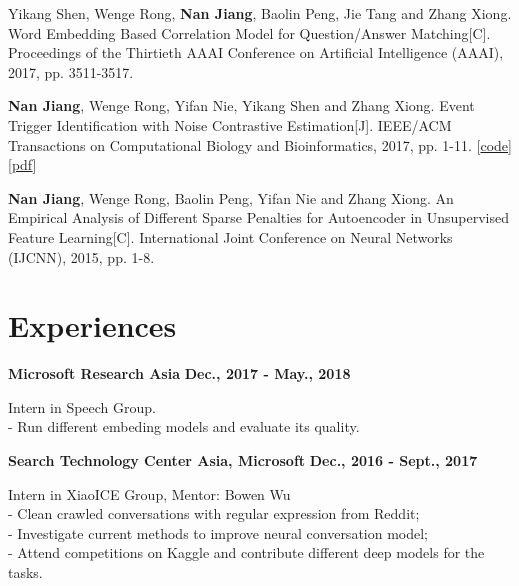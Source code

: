 \documentclass[margin,line]{resume}
\begin{document}
\begin{resume}
Yikang Shen, Wenge Rong, \textbf{Nan Jiang}, Baolin Peng, Jie Tang and Zhang Xiong. Word Embedding Based Correlation Model for Question/Answer Matching[C]. Proceedings of the Thirtieth {AAAI} Conference on Artificial Intelligence (AAAI), 2017, pp. 3511-3517.

\textbf{Nan Jiang}, Wenge Rong, Yifan Nie, Yikang Shen and Zhang Xiong. Event Trigger Identification with Noise Contrastive Estimation[J]. IEEE/ACM Transactions on Computational Biology and Bioinformatics, 2017, pp. 1-11. [\href{https://github.com/jiangnanHugo/mlee-nce}{code}][\href{https://github.com/jiangnanhugo/paper/blob/master/APBC2017/APBC2017.pdf}{pdf}]


\textbf{Nan Jiang}, Wenge Rong, Baolin Peng, Yifan Nie and Zhang Xiong. An Empirical Analysis of Different Sparse Penalties
for Autoencoder in Unsupervised Feature Learning[C]. International Joint Conference on Neural Networks (IJCNN), 2015, pp. 1-8.




\section{Experiences}
{\bf Microsoft Research Asia} \hfill {\bf Dec., 2017 - May., 2018}

{Intern in Speech Group.} \\
- Run different embeding models and evaluate its quality.



{\bf Search Technology Center Asia, Microsoft} \hfill {\bf Dec., 2016 - Sept., 2017}

{Intern in XiaoICE Group, Mentor: Bowen Wu} \\
- Clean crawled conversations with regular expression from Reddit;\\
- Investigate current methods to improve neural conversation model;\\
- Attend competitions on Kaggle and contribute different deep models for the tasks.




%



\end{resume}
\end{document}
